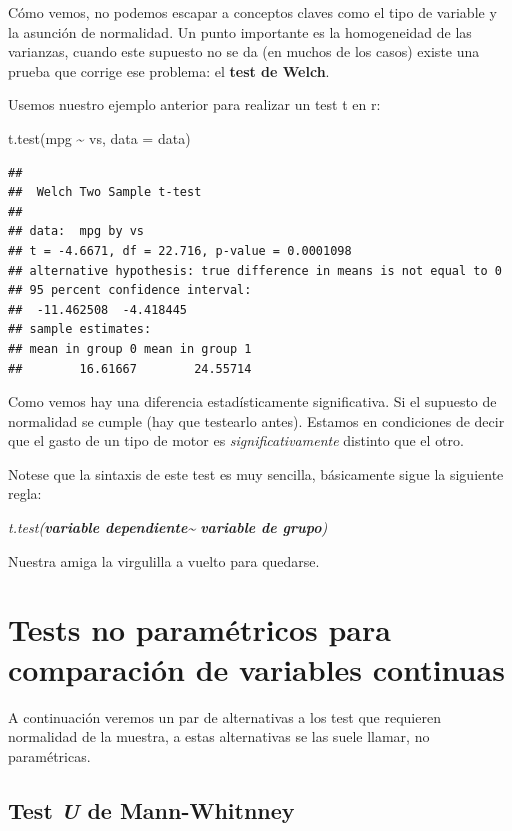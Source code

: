 \documentclass[
]{book}
\newenvironment{Shaded}{\begin{snugshade}}{\end{snugshade}}
\newcommand{\AttributeTok}[1]{\textcolor[rgb]{0.77,0.63,0.00}{#1}}
\newcommand{\FunctionTok}[1]{\textcolor[rgb]{0.00,0.00,0.00}{#1}}
\newcommand{\NormalTok}[1]{#1}
\newcommand{\SpecialCharTok}[1]{\textcolor[rgb]{0.00,0.00,0.00}{#1}}
\begin{document}
Cómo vemos, no podemos escapar a conceptos claves como el tipo de variable y la asunción de normalidad. Un punto importante es la homogeneidad de las varianzas, cuando este supuesto no se da (en muchos de los casos) existe una prueba que corrige ese problema: el \textbf{test de Welch}.

Usemos nuestro ejemplo anterior para realizar un test t en r:

\begin{Shaded}
\begin{Highlighting}[]
\FunctionTok{t.test}\NormalTok{(mpg }\SpecialCharTok{\textasciitilde{}}\NormalTok{ vs, }\AttributeTok{data =}\NormalTok{ data)}
\end{Highlighting}
\end{Shaded}

\begin{verbatim}
## 
##  Welch Two Sample t-test
## 
## data:  mpg by vs
## t = -4.6671, df = 22.716, p-value = 0.0001098
## alternative hypothesis: true difference in means is not equal to 0
## 95 percent confidence interval:
##  -11.462508  -4.418445
## sample estimates:
## mean in group 0 mean in group 1 
##        16.61667        24.55714
\end{verbatim}

Como vemos hay una diferencia estadísticamente significativa. Si el supuesto de normalidad se cumple (hay que testearlo antes). Estamos en condiciones de decir que el gasto de un tipo de motor es \emph{significativamente} distinto que el otro.

Notese que la sintaxis de este test es muy sencilla, básicamente sigue la siguiente regla:

\emph{t.test(\textbf{variable dependiente}\textasciitilde{} \textbf{variable de grupo})}

Nuestra amiga la virgulilla a vuelto para quedarse.

\hypertarget{tests-no-paramuxe9tricos-para-comparaciuxf3n-de-variables-continuas}{%
\section{Tests no paramétricos para comparación de variables continuas}\label{tests-no-paramuxe9tricos-para-comparaciuxf3n-de-variables-continuas}}

A continuación veremos un par de alternativas a los test que requieren normalidad de la muestra, a estas alternativas se las suele llamar, no paramétricas.

\hypertarget{test-u-de-mann-whitnney}{%
\subsection{\texorpdfstring{Test \emph{U} de Mann-Whitnney}{Test U de Mann-Whitnney}}\label{test-u-de-mann-whitnney}}
\end{document}
